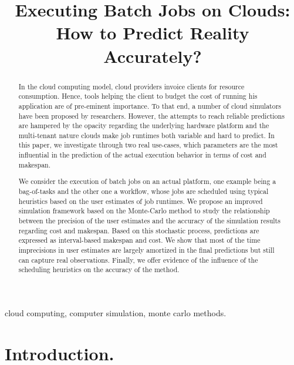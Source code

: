 \documentclass[10pt,conference,compsocconf]{IEEEtran}
\title{Executing Batch Jobs on Clouds: How to Predict Reality Accurately?}
\author{\IEEEauthorblockN{Luke~Bertot 
			and Stéphane~Genaud 
			and Julien~Gossa}
	\IEEEauthorblockA{Icube-ICPS --- UMR 7357, Univeristé de Strasbourg, CNRS\\
		P\^ole API Blvd S. Bant, 67400 Illkirch\\
		email: \url{lbertot@unistra.fr}, \url{genaud@unistra.fr}, \url{gossa@unistra.fr}}
	}
\begin{document}
\maketitle

\begin{abstract}
  In the  cloud computing  model, cloud providers  invoice clients  for resource
  consumption. Hence, tools helping the client to budget the cost of running his
  application are  of pre-eminent  importance. To  that end,  a number  of cloud
  simulators have been  proposed by researchers. However, the  attempts to reach
  reliable  predictions are  hampered by  the opacity  regarding the  underlying
  hardware platform  and the  multi-tenant nature  clouds make job
  runtimes both  variable and hard to  predict.  In this paper,  we investigate
  through two real  use-cases, which parameters are the most  influential in the
  prediction of the actual execution behavior in terms of cost and makespan.

  We consider the execution  of batch jobs on an  actual platform, one example
  being a  bag-of-tasks and the other  one a workflow, whose  jobs are scheduled
  using typical  heuristics based on  the user  estimates of job  runtimes.  We
  propose an  improved simulation framework  based on the Monte-Carlo  method to
  study the  relationship between the  precision of  the user estimates  and the
  accuracy of the simulation results regarding  cost and makespan. Based on this
  stochastic process,  predictions are expressed as  interval-based makespan and
  cost.   We show  that  most  of the time imprecisions  in  user estimates are
  largely amortized in the final predictions but still can capture real
  observations. Finally, we offer evidence of the influence of the scheduling 
  heuristics on the accuracy of the method.
 
\end{abstract}

\begin{IEEEkeywords}
cloud computing, computer simulation, monte carlo methods.
\end{IEEEkeywords}

\tableofcontents

\section{Introduction.}
\end{document}
